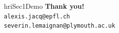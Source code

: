\documentclass[compress]{beamer}
\begin{document}
{
\begin{frame}[plain]

\begin{beamercolorbox}[wd=\linewidth,ht=45ex,dp=10ex]{hriSec1Demo}
    \textbf{Thank you!}\\
    \scriptsize
    {\tt alexis.jacq@epfl.ch}\\
    {\tt severin.lemaignan@plymouth.ac.uk}
\end{beamercolorbox}
    \vfill

\end{frame}
}
\end{document}
